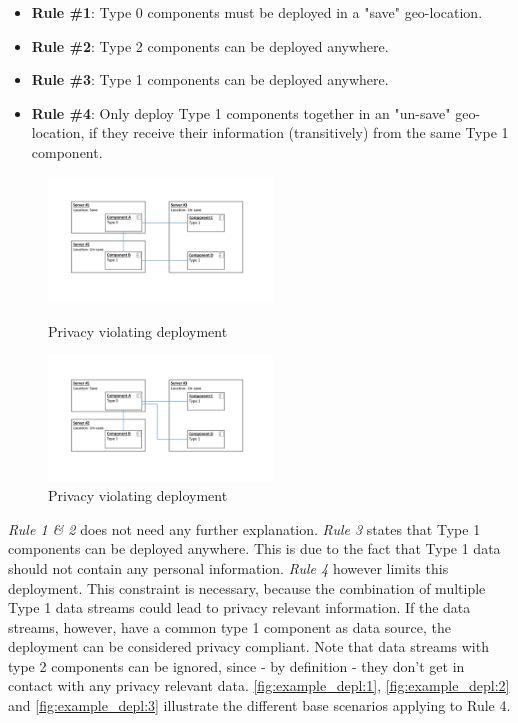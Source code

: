 \begin{itemize}
	\label{enum:deployment_rules}
	\setlength\itemsep{0em}
	\item \textbf{Rule \#1}: Type 0 components must be deployed in a "save" geo-location.
	\item \textbf{Rule \#2}: Type 2 components can be deployed anywhere.
	\item \textbf{Rule \#3}: Type 1 components can be deployed anywhere.
	\item \textbf{Rule \#4}: Only deploy Type 1 components together in an "un-save" geo-location, if they receive their information (transitively) from the same Type 1 component.
\end{itemize}



\begin{figure}
	\begin{center}
		\includegraphics[trim = 35mm 45mm 40mm 30mm, clip, width=0.53\textwidth]{graphs/deployment_example_1}
	\end{center}
	\caption{Privacy violating deployment}
	\label{fig:example_depl:1}
	\begin{center}
		\includegraphics[trim = 35mm 45mm 40mm 30mm, clip, width=0.53\textwidth]{graphs/deployment_example_2}
	\end{center}
	\caption{Privacy violating deployment}
	\label{fig:example_depl:2}
\end{figure}

\textit{Rule 1 \& 2} does not need any further explanation. \textit{Rule 3} states that Type 1 components can be deployed anywhere. This is due to the fact that Type 1 data should not contain any personal information. \textit{Rule 4} however limits this deployment. This constraint is necessary, because the combination of multiple Type 1 data streams could lead to privacy relevant information. If the data streams, however, have a common type 1 component as data source, the deployment can be considered privacy compliant. Note that data streams with type 2 components can be ignored, since - by definition - they don't get in contact with any privacy relevant data. \autoref{fig:example_depl:1}, \autoref{fig:example_depl:2} and \autoref{fig:example_depl:3} illustrate the different base scenarios applying to Rule 4. 


